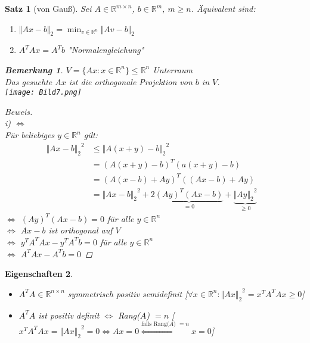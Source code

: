 \documentclass[12pt]{article}
\theoremstyle{break}
\newtheorem{theorem}{Satz}[subsection]
\newtheorem*{comment*}{Bemerkung}
\newtheorem{properties}[theorem]{Eigenschaften}
\begin{document}
\begin{theorem}[von Gauß]
Sei $A \in \mathbb{R}^{m \times n}$, $b \in \mathbb{R}^m$, $m \geq n$. Äquivalent sind:
\renewcommand{\labelenumi}{\roman{enumi})}
\begin{enumerate}
  \item $\Vert Ax - b \Vert_2 = \min_{v \in \mathbb{R}^n} \Vert Av - b \Vert_2$
  \item $A^TAx = A^Tb$ "Normalengleichung"
\end{enumerate}

\begin{comment*}
$V = \{Ax: x \in \mathbb{R}^n \} \leq \mathbb{R}^n$ Unterraum\\
Das gesuchte $Ax$ ist die orthogonale Projektion von $b$ in $V$.\\
\texttt{[image: Bild7.png]}
\end{comment*}
\begin{proof}[Beweis]\leavevmode \\
i) $\Leftrightarrow$ \\
Für beliebiges $y \in \mathbb{R}^n$ gilt:
\begin{align*}
{\Vert Ax - b \Vert_2}^2 &\leq {\Vert A(x+y) - b \Vert_2}^2 &\\
&= (A(x+y)-b)^T(a(x+y)-b) &\\
&= (A(x-b)+Ay)^T((Ax-b) + Ay) &\\
&= {\Vert Ax - b \Vert_2}^2 + 2\underbrace{(Ay)^T (Ax-b)}_{=0} + \underbrace{{\Vert Ay \Vert_2}^2}_{\geq 0} 
\end{align*}
$\Leftrightarrow$ $(Ay)^T(Ax-b) = 0$ für alle $y \in \mathbb{R}^n$ \\
$\Leftrightarrow$ $Ax-b$ ist orthogonal auf $V$ \\
$\Leftrightarrow$ $y^TA^TAx -y^TA^Tb = 0$ für alle $y \in \mathbb{R}^n$ \\
$\Leftrightarrow$ $A^TAx - A^Tb = 0$ 
\end{proof}
\end{theorem}

\begin{properties}\leavevmode
\begin{itemize}
  \item $A^TA \in \mathbb{R}^{n \times n}$ symmetrisch positiv semidefinit [$\forall x \in \mathbb{R}^n: {\Vert Ax \Vert_2}^2 = x^TA^TAx \geq 0$]
  \item $A^TA$ ist positiv definit $\Leftrightarrow$ Rang($A$) $= n$  [$x^TA^TAx = {\Vert Ax \Vert_2}^2 = 0 \Leftrightarrow Ax = 0 \overset{\text{falls Rang($A$) $=n$}}{ \Leftrightarrow} x = 0$]
\end{itemize}
\end{properties}
\end{document}
